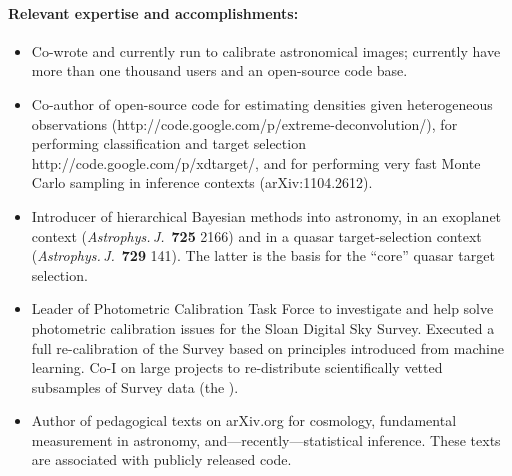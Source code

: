 \documentclass[letterpaper,12pt]{article}
\begin{document}
\paragraph{Relevant expertise and accomplishments:}
\begin{itemize}\setlength{\itemsep}{0pt}
\item
Co-wrote and currently run  to calibrate
astronomical images; currently have more than one thousand users and
an open-source code base.
\item
Co-author of open-source code for estimating densities
given heterogeneous observations
(http://code.google.com/p/extreme-deconvolution/), for performing
classification and target selection
http://code.google.com/p/xdtarget/, and for performing very fast Monte
Carlo sampling in inference contexts (arXiv:1104.2612).
\item
Introducer of hierarchical Bayesian methods into astronomy, in an
exoplanet context (\textit{Astrophys.\,J.}\ \textbf{725} 2166) and in
a quasar target-selection context
(\textit{Astrophys.\,J.}\ \textbf{729} 141).  The latter is the basis
for the  ``core'' quasar target selection.
\item
Leader of Photometric Calibration Task Force to investigate and help
solve photometric calibration issues for the Sloan Digital Sky Survey.
Executed a full re-calibration of the Survey based on principles
introduced from machine learning.  Co-I on large projects to
re-distribute scientifically vetted subsamples of Survey data (the
).
\item
Author of pedagogical texts on arXiv.org for cosmology, fundamental
measurement in astronomy, and---recently---statistical inference.
These texts are associated with publicly released code.
\end{itemize}
\end{document}
